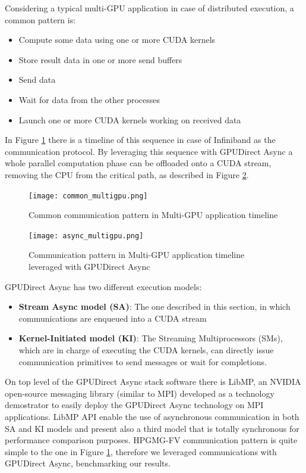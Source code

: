 \documentclass[review]{siamart1116}
\begin{document}
Considering a typical multi-GPU application in case of distributed execution, a common pattern is:
\begin{itemize}
\item Compute some data using one or more CUDA kernels
\item Store result data in one or more send buffers
\item Send data
\item Wait for data from the other processes
\item Launch one or more CUDA kernels working on received data
\end{itemize}
In Figure \ref{fig:commonmultigpu} there is a timeline of this sequence in case of Infiniband as the communication protocol. By leveraging this sequence with GPUDirect Async a
whole parallel computation phase can be offloaded onto a
CUDA stream, removing the CPU from the critical path, as described
in Figure \ref{fig:asyncmultigpu}.\\

\begin{figure}[h]
\centering
\texttt{[image: common\_multigpu.png]}
\caption{Common communication pattern in Multi-GPU application timeline}
\label{fig:commonmultigpu}
\end{figure}


\begin{figure}[h]
\centering
\texttt{[image: async\_multigpu.png]}
\caption{Communication pattern in Multi-GPU application timeline leveraged with GPUDirect Async}
\label{fig:asyncmultigpu}
\end{figure}

GPUDirect Async has two different execution models:

\begin{itemize}
\item \textbf{Stream Async model (SA)}: The one described in this section, in which communications are enqueued into a CUDA stream
\item \textbf{Kernel-Initiated model (KI)}: The Streaming Multiprocessors (SMs), which are in charge of executing the CUDA kernels, can directly issue communication primitives to send messages or wait for completions. %
\end{itemize}

On top level of the GPUDirect Async stack software there is LibMP, an NVIDIA open-source messaging library (similar to MPI) developed as a technology demostrator to easily deploy the GPUDirect Async technology on MPI applications. LibMP API enable the use of asynchronous communication in both SA and KI models and present also a third model that is totally synchronous for performance comparison purposes.
HPGMG-FV communication pattern is quite simple to the one in Figure \ref{fig:commonmultigpu}, therefore we leveraged communications with GPUDirect Async, benchmarking our results.\\
\end{document}

